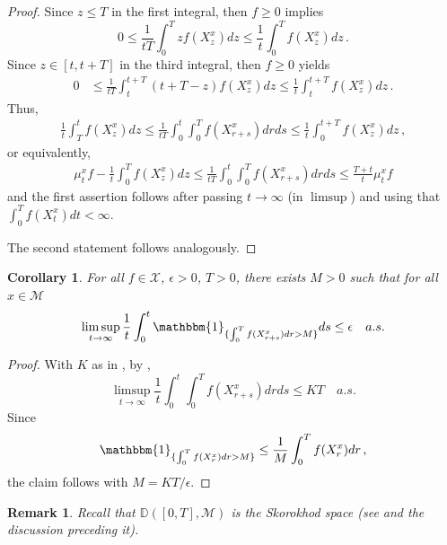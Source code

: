 \documentclass[final]{amsart}
\newtheorem{cor}[thm]{Corollary}
\newtheorem{rem}[thm]{Remark}
\numberwithin{thm}{section}
\numberwithin{equation}{section}
\newcommand{\mcM}{\mathcal{M}}
\newcommand{\Id}{\mathbbm{1}}
\newcommand{\D}{\mathbb{D}}
\newcommand{\X}{\mathcal{X}}
\begin{document}
\begin{proof}
Since $z \leq T$ in the first integral, then $f \geq 0$  implies
$$
0 \leq \frac{1}{tT} \int_0^T zf(X_z^x)dz \leq 
\frac{1}{t} \int_0^T f(X_z^x)dz \,. 
$$
Since $z \in [t, t+T]$ in the third integral, then $f \geq 0$ yields
\begin{align*}
  0 &\leq \frac{1}{tT} \int_t^{t + T} (t+T-z)f(X_z^x)dz 
 \leq
  \frac{1}{t} \int_t^{t + T} f(X_z^x)dz \,.
\end{align*}
Thus, 
\begin{align*}
  \frac{1}{t}\int_T^t f(X_z^x)dz \leq  \frac{1}{tT}
\int_0^t\int_0^T f(X_{r+s}^x)drds \leq 
\frac{1}{t}\int_0^{t+T} f(X_z^x)dz \,,
\end{align*}
or equivalently, 
\begin{align*}
 \mu_t^xf - \frac{1}{t}\int_0^T f(X_z^x)dz \leq  \frac{1}{tT}
\int_0^t\int_0^T f(X_{r+s}^x)drds \leq 
\frac{T+t}{t} \mu_t^xf 
\end{align*}
and the first assertion follows after passing $t \to \infty$ (in $\limsup$) and using that $\int_0^T f(X_t^x)dt < \infty$. 

The second statement follows analogously. 





\end{proof}


\begin{cor}\label{int-f-smaller-than-M}
    For all $f \in \X$, $\epsilon > 0$, $T > 0$, there exists $M > 0$ such that for all $x \in \mcM$
    $$\limsup_{t \to \infty} \frac{1}{t}\int_0^t \Id_{\{\int_0^T f(X_{r+s}^x)dr > M\}}ds \leq \epsilon \quad a.s.$$
\end{cor}

\begin{proof}
    With $K$ as in , by ,
    $$\limsup_{t \to \infty} \frac{1}{t}\int_0^t \int_0^T f(X_{r+s}^x)drds \leq KT \quad a.s.$$
    Since
    $$\Id_{\{\int_0^T f(X_{r}^x)dr > M\}} \leq \frac{1}{M} \int_0^T f(X_{r}^x)dr \,,$$
    the claim follows with $M = KT/\epsilon$.
\end{proof}

\begin{rem}
    Recall that  $\D([0,T],\mcM)$ is the Skorokhod space (see \cite[Lemma 5.2]{extinction} and the discussion preceding it).
\end{rem}
\end{document}
